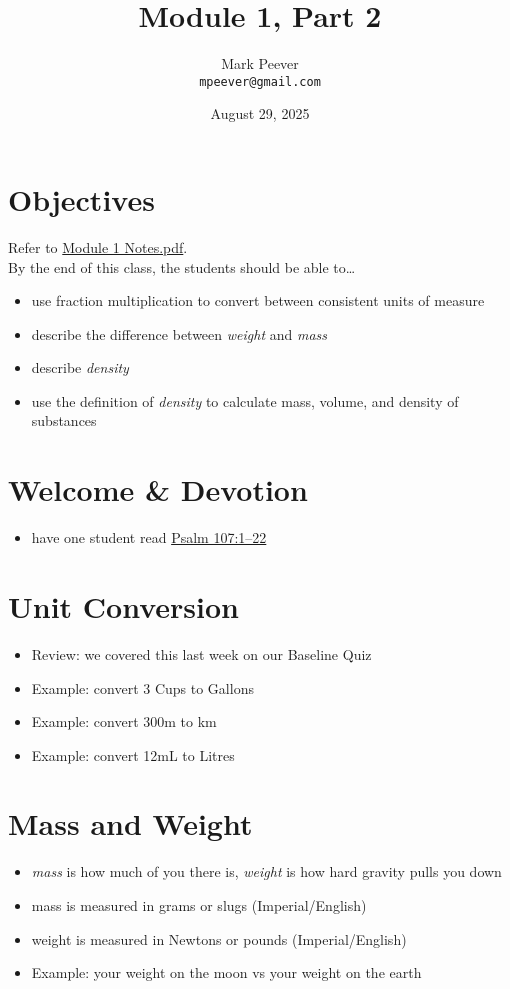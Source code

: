 \documentclass[10pt, oneside]{article}   	%
\title{Module 1, Part 2}
\author{Mark Peever\\ \texttt{mpeever@gmail.com}}
\date{August 29, 2025}
\begin{document}
\maketitle



\section*{Objectives}
Refer to \href{https://drive.google.com/file/d/1p-i3eBQ1MXrmtNDu9kW5U6uMlN-BSEsR/view?usp=sharing}{Module 1 Notes.pdf}.\\

By the end of this class, the students should be able to\ldots
\begin{itemize}
\item use fraction multiplication to convert between consistent units of measure
\item describe the difference between \emph{weight} and \emph{mass}
\item describe \emph{density}
\item use the definition of \emph{density} to calculate mass, volume, and density of substances
\end{itemize}

\section*{Welcome \& Devotion}
\begin{itemize}
\item have one student read \href{https://www.biblegateway.com/passage/?search=Psalm\%20107\&version=LSB}{Psalm 107:1--22}
\end{itemize}

\section*{Unit Conversion}
\begin{itemize}
\item Review: we covered this last week on our Baseline Quiz
\item Example: convert 3 Cups to Gallons
\item Example: convert 300m to km
\item Example: convert 12mL to Litres
\end{itemize}

\section*{Mass and Weight}
\begin{itemize}
\item \emph{mass} is how much of you there is, \emph{weight} is how hard gravity pulls you down
\item mass is measured in grams or slugs (Imperial/English)
\item weight is measured in Newtons or pounds (Imperial/English)
\item Example: your weight on the moon vs your weight on the earth 
\end{itemize}
\end{document}
